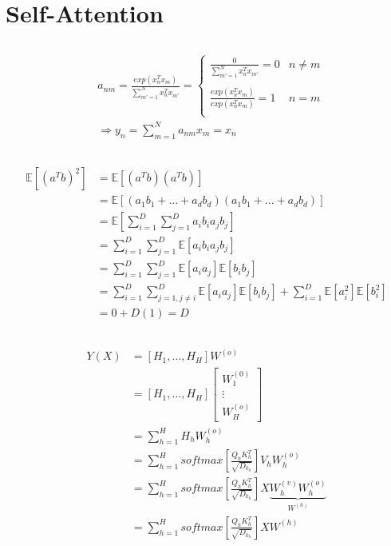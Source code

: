 \documentclass{article}
\begin{document}
\section{Self-Attention}
\subsection{}
\begin{align*}
    &a_{nm} = \frac{exp(x_n^Tx_m)}{\sum_{m'=1}^N x_n^Tx_{m'}} = 
    \begin{cases}
        \frac{0}{\sum_{m'=1}^N x_n^Tx_{m'}} = 0 &n \neq m\\ \\
        \frac{exp(x_n^Tx_m)}{exp(x_n^Tx_m)} = 1 &n = m \\
    \end{cases} \\
    &\Rightarrow y_n = \sum_{m=1}^Na_{nm}x_m = x_n
\end{align*}


\subsection{}
\begin{align*}
    \mathbb{E}[(a^Tb)^2]
    &= \mathbb{E}[(a^Tb)(a^Tb)] \\
    &= \mathbb{E}[(a_1b_1 + \dots + a_db_d)(a_1b_1 + \dots + a_db_d)] \\
    &= \mathbb{E}[\sum_{i=1}^D\sum_{j=1}^Da_ib_ia_jb_j] \\ 
    &= \sum_{i=1}^D\sum_{j=1}^D\mathbb{E}[a_ib_ia_jb_j] \\
    &= \sum_{i=1}^D\sum_{j=1}^D\mathbb{E}[a_ia_j]\mathbb{E}[b_ib_j] \\
    &= \sum_{i=1}^D\sum_{j=1, j\neq i}^D\mathbb{E}[a_ia_j]\mathbb{E}[b_ib_j] 
    + \sum_{i=1}^D \mathbb{E}[a_i^2]\mathbb{E}[b_i^2] \\
    &= 0 + D(1) = D
\end{align*}


\subsection{}
\begin{align*}
    Y(X) 
    &= [H_1, \dots, H_H] W^{(o)} \\
    &= [H_1, \dots, H_H] 
    \begin{bmatrix}
        W_1^{(0)} \\
        \vdots \\
        W_H^{(o)}
    \end{bmatrix} \\
    &= \sum_{h=1}^H H_hW_h^{(o)} \\
    &= \sum_{h=1}^H softmax[\frac{Q_hK_h^T}{\sqrt{D_{k_h}}}]V_hW_h^{(o)} \\
    &= \sum_{h=1}^H softmax[\frac{Q_hK_h^T}{\sqrt{D_{k_h}}}]X\underbrace{W_h^{(v)}W_h^{(o)}}_{W^{(h)}} \\
    &= \sum_{h=1}^H softmax[\frac{Q_hK_h^T}{\sqrt{D_{k_h}}}]XW^{(h)} \\
\end{align*}
\end{document}
